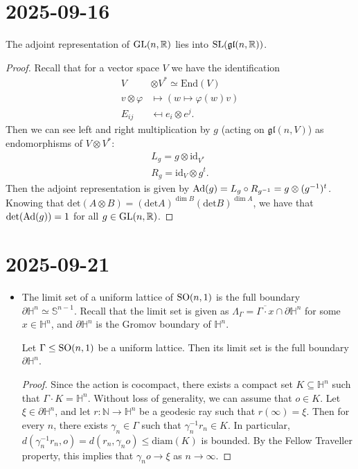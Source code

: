 \documentclass{report}
\begin{document}
\section{2025-09-16}
\begin{proposition}
The adjoint representation of $\operatorname{{\mathrm{GL}}}(n, \mathbb R)$ lies into $\operatorname{{\mathrm{SL}}}(\operatorname{{\mathfrak{gl}}}(n, \mathbb R))$.    
\end{proposition}
\begin{proof}
Recall that for a vector space $V$ we have the identification
\begin{align*}
    V &\otimes V^* \simeq \mathrm{End}(V)\\
    v \otimes \varphi &\mapsto (w \mapsto \varphi(w) v)\\
    E_{ij} &\mapsfrom e_i \otimes e^j.
\end{align*}
Then we can see left and right multiplication by $g$ (acting on $\mathfrak{gl}(n, V)$) as endomorphisms of $V \otimes V^*$:
\begin{align*}
    L_g = g \otimes \mathrm{id}_{V^*}\\
    R_g = \mathrm{id}_V \otimes g^t.
\end{align*}
Then the adjoint representation is given by $\operatorname{Ad}(g) = L_g \circ R_{g^{-1}} = g \otimes (g^{-1})^t$.
Knowing that $\mathrm{det}(A \otimes B) = (\mathrm{det} A)^{\dim B} (\mathrm{det} B)^{\dim A}$, we have that $\mathrm{det}(\operatorname{Ad}(g)) = 1$ for all $g \in \operatorname{{\mathrm{GL}}}(n, \mathbb R)$.    
\end{proof}
\section{2025-09-21}
\begin{itemize}
    \item
The limit set of a uniform lattice of $\operatorname{{\mathrm{SO}}}(n,1)$ is the full boundary $\partial \mathbb H^n \simeq \mathbb S^{n-1}$.
Recall that the limit set is given as $\Lambda_\Gamma = \overline{\Gamma \cdot x} \cap \partial \mathbb H^n$ for some $x \in \mathbb H^n$, and $\partial \mathbb H^n$ is the Gromov boundary of $\mathbb H^n$.
\begin{proposition}
    Let $\Gamma \leq \operatorname{{\mathrm{SO}}}(n,1)$ be a uniform lattice.
    Then its limit set is the full boundary $\partial \mathbb H^n$.
\end{proposition}
\begin{proof}
    Since the action is cocompact, there exists a compact set $K \subseteq \mathbb H^n$ such that $\Gamma \cdot K = \mathbb H^n$.
    Without loss of generality, we can assume that $o \in K$.
    Let $\xi \in \partial \mathbb H^n$, and let $r: \mathbb N \to \mathbb H^n$ be a geodesic ray such that $r(\infty) = \xi$.
    Then for every $n$, there exists $\gamma_n \in \Gamma$ such that $\gamma_n^{-1} r_n \in K$.
    In particular, $d(\gamma_n^{-1} r_n, o) = d(r_n, \gamma_n o) \leq \mathrm{diam}(K)$ is bounded.
    By the Fellow Traveller property, this implies that $\gamma_n o \to \xi$ as $n \to \infty$.
\end{proof}
\end{itemize}
\end{document}
